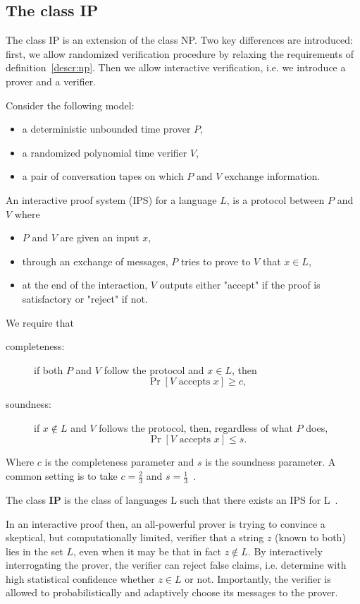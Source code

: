 \subsection{The class IP}
The class IP is an extension of the class NP. Two key differences are introduced: first, we allow randomized verification procedure by relaxing the requirements of definition~\ref{descr:np}. Then we allow interactive verification, i.e. we introduce a prover and a verifier.
\begin{defn}
    Consider the following model:
    \begin{itemize}
        \item a deterministic unbounded time prover $P$,
        \item a randomized polynomial time verifier $V$,
        \item a pair of conversation tapes on which $P$ and $V$ exchange information.
    \end{itemize}
    An interactive proof system (IPS) for a language $L$, is a protocol between $P$ and $V$ where
    \begin{itemize}
        \item $P$ and $V$ are given an input $x$,
        \item through an exchange of messages, $P$ tries to prove to $V$ that $x \in L$,
        \item at the end of the interaction, $V$ outputs either "accept" if the proof is satisfactory or "reject" if not.
    \end{itemize}
    We require that
    \begin{description}
\item[completeness:] if both $P$ and $V$ follow the protocol and $x \in L$, then
$$
\operatorname{Pr}[V \text { accepts } x] \geq c,
$$
\item[soundness:] if $x \notin L$ and $V$ follows the protocol, then, regardless of what $P$ does,
$$
\operatorname{Pr}[V \text { accepts } x] \leq s.
$$
    \end{description}
    Where $c$ is the completeness parameter and $s$ is the soundness parameter. A common setting is to take $c=\frac{2}{3}$ and $s=\frac{1}{3}$~\cite{randomness}.
\end{defn}

\begin{defn}
    The class \textbf{IP} is the class of languages L such that there exists an IPS for L~\cite{randomness}.
\end{defn}
In an interactive proof then, an all-powerful prover is trying to convince a skeptical, but computationally limited, verifier that a string $z$ (known to both) lies in the set $L$, even when it may be that in fact $z \notin L$. By interactively interrogating the prover, the verifier can reject false claims, i.e. determine with high statistical confidence whether $z \in L$ or not. Importantly, the verifier is allowed to probabilistically and adaptively choose its messages to the prover.


